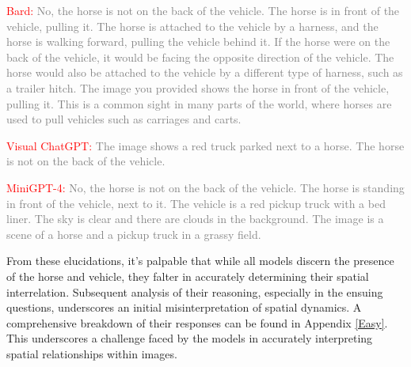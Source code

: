 \documentclass[twocolumn,11pt]{report}
\begin{document}
\textcolor{red}{Bard:} \textcolor{gray}{No, the horse is not on the back of the vehicle. The horse is in front of the vehicle, pulling it. The horse is attached to the vehicle by a harness, and the horse is walking forward, pulling the vehicle behind it. If the horse were on the back of the vehicle, it would be facing the opposite direction of the vehicle. The horse would also be attached to the vehicle by a different type of harness, such as a trailer hitch. The image you provided shows the horse in front of the vehicle, pulling it. This is a common sight in many parts of the world, where horses are used to pull vehicles such as carriages and carts.}

\textcolor{red}{Visual ChatGPT:} \textcolor{gray}{The image shows a red truck parked next to a horse. The horse is not on the back of the vehicle.}

\textcolor{red}{MiniGPT-4:} \textcolor{gray}{No, the horse is not on the back of the vehicle. The horse is standing in front of the vehicle, next to it. The vehicle is a red pickup truck with a bed liner. The sky is clear and there are clouds in the background. The image is a scene of a horse and a pickup truck in a grassy field.}

From these elucidations, it's palpable that while all models discern the presence of the horse and vehicle, they falter in accurately determining their spatial interrelation. Subsequent analysis of their reasoning, especially in the ensuing questions, underscores an initial misinterpretation of spatial dynamics. A comprehensive breakdown of their responses can be found in Appendix \ref{Easy}. This underscores a challenge faced by the models in accurately interpreting spatial relationships within images.
\end{document}

